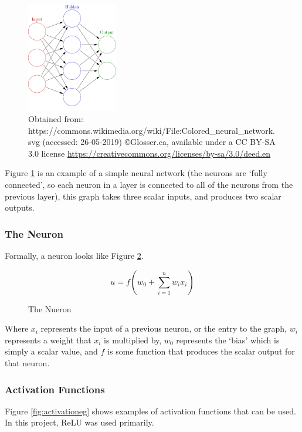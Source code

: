     \begin{figure}[h]
        \centering
        \includegraphics[width=150px]{../img/1000px-Colored_neural_network.png}
        \caption{Obtained from: https://commons.wikimedia.org/wiki/File:Colored\_neural\_network.svg (accessed: 26-05-2019) \copyright \space Glosser.ca, available under a CC BY-SA 3.0 license \url{https://creativecommons.org/licenses/by-sa/3.0/deed.en}}
        \label{fig:fcneuralnet}
    \end{figure}

    Figure \ref{fig:fcneuralnet} is an example of a simple neural network (the neurons are `fully connected', so each neuron in a layer is connected to all of the neurons from the previous layer), this graph takes three scalar inputs, and produces two scalar outputs.

        \subsubsection{The Neuron}
        Formally, a neuron looks like Figure \ref{fig:theneuron}.
        \begin{figure}[h]
        \[
            u=f(w_0+\sum_{i=1}^nw_ix_i)
        \]
        \caption{The Nueron}
        \label{fig:theneuron}
        \end{figure}
        Where $x_i$ represents the input of a previous neuron, or the entry to the graph, $w_i$ represents a weight that $x_i$ is multiplied by, $w_0$ represents the `bias' which is simply a scalar value, and $f$ is some function that produces the scalar output for that neuron.
        
        \subsubsection{Activation Functions}
        Figure \ref{fig:activationeg} shows examples of activation functions that can be used. In this project, ReLU was used primarily.\\


